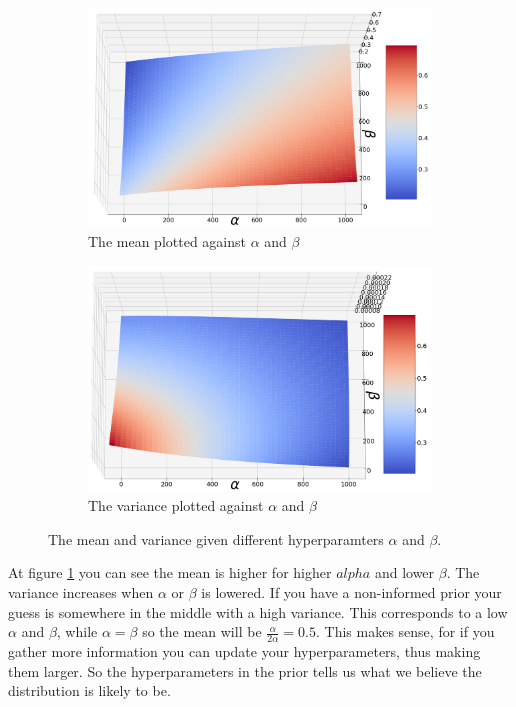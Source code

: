\documentclass[a4paper]{article}
\begin{document}
\begin{figure}[H]
	\centering
	\begin{subfigure}{0.45\textwidth} %
		\includegraphics[width=\textwidth]{First_3d_Plot.png}
		\caption{The mean plotted against $\alpha$ and $\beta$} %
	\end{subfigure}
	\begin{subfigure}{0.45\textwidth} %
		\includegraphics[width=\textwidth]{Second_3d_Plot.png}
		\caption{The variance plotted against $\alpha$ and $\beta$} %
	\end{subfigure}
	\caption{The mean and variance given different hyperparamters $\alpha$ and $\beta$.} %
	\label{Double3D}
\end{figure}

At figure \ref{Double3D} you can see the mean is higher for higher $alpha$ and lower $\beta$. The variance increases when $\alpha$ or $\beta$ is lowered. 
If you have a non-informed prior your guess is somewhere in the middle with a high variance. This corresponds to a low $\alpha$ and $\beta$, while $\alpha=\beta$ so the mean will be $\frac{\alpha}{2\alpha} = 0.5$.
This makes sense, for if you gather more information you can update your hyperparameters, thus making them larger. So the hyperparameters in the prior tells us what we believe the distribution is likely to be.
\end{document}
